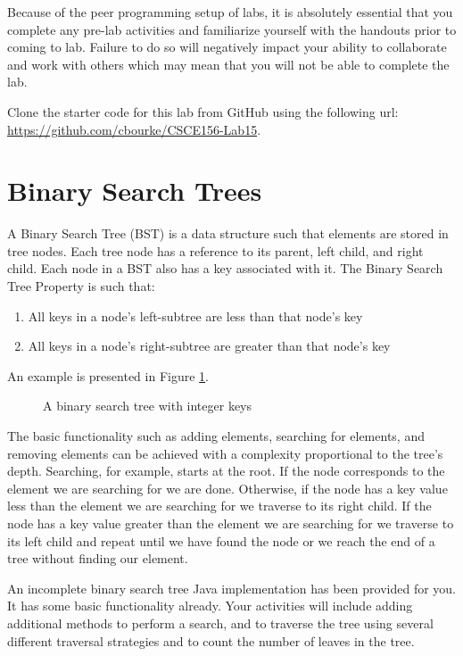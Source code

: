 \documentclass[12pt]{scrartcl}
\begin{document}
Because of the peer programming setup of labs, it is absolutely 
essential that you complete any pre-lab activities and familiarize
yourself with the handouts prior to coming to lab.  Failure to do
so will negatively impact your ability to collaborate and work with 
others which may mean that you will not be able to complete the
lab.  

Clone the starter code for this lab from GitHub using the following
url: \url{https://github.com/cbourke/CSCE156-Lab15}.

\section*{Binary Search Trees}

A Binary Search Tree (BST) is a data structure such that elements 
are stored in tree nodes.  Each tree node has a reference 
to its parent, left child, and right child.  Each node in a BST also 
has a key associated with it.  The Binary Search Tree Property is 
such that:
\begin{enumerate}
  \item All keys in a node's left-subtree are less than that node's key
  \item All keys in a node's right-subtree are greater than that node's key
\end{enumerate}  
An example is presented in Figure \ref{figure:bst}.

\begin{figure}[h]
\centering

\caption{A binary search tree with integer keys}
\label{figure:bst}
\end{figure}

The basic functionality such as adding elements, searching for elements, 
and removing elements can be achieved with a complexity proportional to 
the tree's depth.  Searching, for example, starts at the root.  If the 
node corresponds to the element we are searching for we are done.  
Otherwise, if the node has a key value less than the element we are 
searching for we traverse to its right child.  If the node has a key 
value greater than the element we are searching for we traverse to its 
left child and repeat until we have found the node or we reach the 
end of a tree without finding our element.

An incomplete binary search tree Java implementation has been provided 
for you.  It has some basic functionality already.  Your activities 
will include adding additional methods to perform a search, and to 
traverse the tree using several different traversal strategies and to 
count the number of leaves in the tree.
\end{document}
